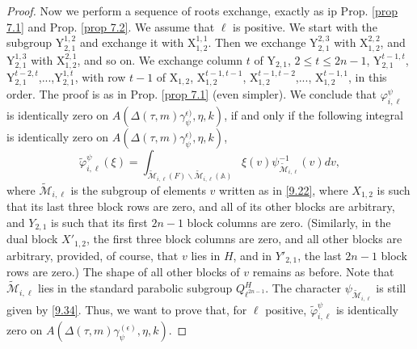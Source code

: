 \documentclass[12pts]{amsart}
\newcommand{\BA}{{\mathbb {A}}}
\begin{document}
\begin{proof}
 Now we perform a sequence of roots exchange, exactly as ip Prop. \ref{prop 7.1} and Prop. \ref{prop 7.2}. We assume that $\ell$ is positive. We start with the subgroup $\mathrm{Y}_{2,1}^{1,2}$ and exchange it with $\mathrm{X}_{1,2}^{1,1}$. Then we exchange $\mathrm{Y}_{2,1}^{2,3}$ with $\mathrm{X}_{1,2}^{2,2}$, and $\mathrm{Y}_{2,1}^{1,3}$ with $\mathrm{X}_{1,2}^{2,1}$, and so on. We exchange column $t$ of $\mathrm{Y}_{2,1}$, $2\leq t\leq 2n-1$, $\mathrm{Y}_{2,1}^{t-1,t}$, $\mathrm{Y}_{2,1}^{t-2,t}$,...,$\mathrm{Y}_{2,1}^{1,t}$, with row $t-1$ of $\mathrm{X}_{1,2}$, $\mathrm{X}_{1,2}^{t-1,t-1}$, $\mathrm{X}_{1,2}^{t-1,t-2}$,..., $\mathrm{X}_{1,2}^{t-1,1}$, in this order. The proof is as in Prop. \ref{prop 7.1} (even simpler). We conclude that $\varphi_{i,\ell}^\psi$ is identically zero on $A(\Delta(\tau,m)\gamma_\psi^{\epsilon)},\eta,k)$, if and only if the following integral is identically zero on $A(\Delta(\tau,m)\gamma_\psi^{\epsilon)},\eta,k)$, 
 \begin{equation}\label{9.35}
 \tilde{\varphi}_{i,\ell}^\psi(\xi)=
 \int_{\tilde{\mathcal{M}}_{i,\ell}(F)\backslash
 	\tilde{\mathcal{M}}_{i,\ell}(\BA)}\xi(v)\psi^{-1}_{\tilde{\mathcal{M}}_{i,\ell}}(v)dv, 
 \end{equation}
 where $\tilde{\mathcal{M}}_{i,\ell}$ is the subgroup of elements $v$ written as in \eqref{9.22}, where $X_{1,2}$ is such that its last three block rows are zero, and all of its other blocks are arbitrary, and $Y_{2,1}$ is such that its first $2n-1$ block columns are zero. (Similarly, in the dual block $X'_{1,2}$, the first three block columns are zero, and all other blocks are arbitrary, provided, of course, that $v$ lies in $H$, and in $Y'_{2,1}$, the last $2n-1$ block rows are zero.) The shape of all other blocks of $v$ remains as before. Note that $\tilde{\mathcal{M}}_{i,\ell}$ lies in the standard parabolic subgroup $Q^H_{\ell^{2n-1}}$.  The character $\psi_{\tilde{\mathcal{M}}_{i,\ell}}$ is still given by \eqref{9.34}. Thus, we want to prove that, for $\ell$ positive, $\tilde{\varphi}_{i,\ell}^\psi$ is identically zero on $A(\Delta(\tau,m)\gamma_\psi^{(\epsilon)},\eta,k)$. 
 

\end{proof}
\end{document}
